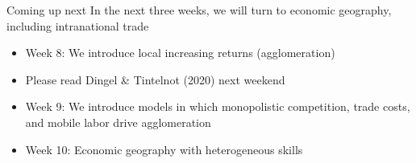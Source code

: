 \documentclass[10pt,notes=hide]{beamer}
\begin{document}
\begin{frame}{Coming up next}
In the next three weeks, we will turn to economic geography, including intranational trade
\begin{itemize}
\item Week 8: We introduce local increasing returns (agglomeration)
\item[] Please read Dingel \& Tintelnot (2020) next weekend
\item Week 9: We introduce models in which  monopolistic competition, trade costs, and mobile labor drive agglomeration
\item Week 10: Economic geography with heterogeneous skills
\end{itemize}
\end{frame}
\end{document}
